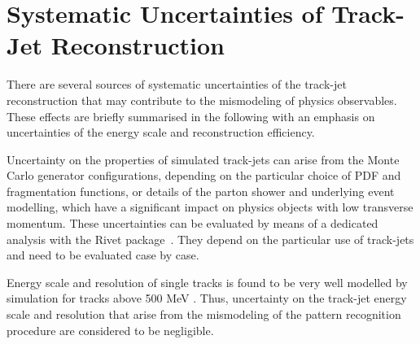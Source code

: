 

\section{Systematic Uncertainties of Track-Jet Reconstruction}\label{sec:trackjetsys}

%
%


There are several sources of systematic uncertainties of the track-jet reconstruction that may contribute to
the mismodeling of physics observables.  These effects  are briefly summarised in the following with an emphasis on 
uncertainties of the energy scale and reconstruction efficiency. %

Uncertainty on the properties of simulated track-jets can arise from the Monte Carlo generator
configurations, depending on the particular choice of PDF and fragmentation functions, or details of the parton shower and underlying 
event modelling, which have a significant impact on physics objects with low transverse momentum. 
These uncertainties can be evaluated by means of a dedicated analysis with the Rivet package~\cite{RIVET}.
They depend on the particular  use of track-jets and need to be evaluated case by case.

Energy scale and resolution of single tracks is found to be very well modelled by simulation for tracks above
500 MeV \cite{IDperformance}. Thus, uncertainty on the track-jet energy scale and resolution that arise from the mismodeling of
the pattern recognition procedure are considered to be negligible. 

